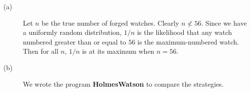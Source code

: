 \documentclass{tufte-handout}
\begin{document}
\begin{description}
\item[\rm (a)] Let $n$ be the true number of forged watches. Clearly
  $n \nless 56$. Since we have a uniformly random distribution, $1/n$
  is the likelihood that any watch numbered greater than or equal to
  $56$ is the maximum-numbered watch. Then for all $n$,
  $1/n$ is at its maximum when $n = 56$.
\item[\rm (b)] We wrote the program \textbf{HolmesWatson} to compare
  the strategies.
\end{description}
\end{document}
